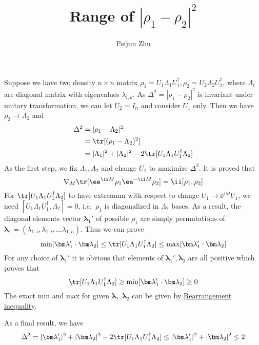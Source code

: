 \documentclass{article}
\begin{document}
\author{Peijun Zhu}
\title{Range of $|\rho_1-\rho_2|^2$}
\maketitle


Suppose we have two density $n\times n$ matrix 
$\rho_1=U_1\Lambda_1U_1^\dagger, \rho_2=U_2\Lambda_2U_2^\dagger$, where $\Lambda_i$ are diagonal matrix with eigenvalues $\lambda_{i, k}$. As $\Delta^2=|\rho_1-\rho_2|^2$ is invariant under unitary transformation, we can let $U_2=I_n$ and consider $U_1$ only. Then we have $\rho_2\rightarrow \Lambda_2$ and
\begin{align}
	\Delta^2&=|\rho_1-\Lambda_2|^2\\
	&=\tr[(\rho_1-\Lambda_2)^2]\\
	&=|\Lambda_1|^2+|\Lambda_2|^2-2\tr[U_1\Lambda_1U_1^\dagger\Lambda_2]\label{final}
\end{align}
As the first step, we fix $\Lambda_1, \Lambda_2$ and change $U_1$ to maximize $\Delta^2$. It is proved that
\begin{equation}
\nabla_M \tr[\ee^{\ii M}\rho_1\ee^{-\ii M}\rho_2]=\ii[\rho_1, \rho_2]
\end{equation}
For $\tr[U_1\Lambda_1U_1^\dagger\Lambda_2]$ to have extremum with respect to change $U_1\rightarrow \ee^{\ii M}U_1$, we need $[U_1\Lambda_1U_1^\dagger, \Lambda_2]=0$, i.e.\ $\rho_1$ is diagonalized in $\Lambda_2$ bases. As a result, the diagonal elements vector $\bm{\lambda_1}'$ of possible $\rho_1$ are simply permutations of $\bm \lambda_1=(\lambda_{1,i},\lambda_{1,i},\ldots\lambda_{1, n})$. Thus we can prove
\begin{equation}
\min [\bm\lambda_1'\cdot\bm\lambda_2]\leq\tr[U_1\Lambda_1U_1^\dagger\Lambda_2]\leq \max [\bm\lambda_1'\cdot\bm\lambda_2]
\end{equation}
For any choice of $\bm\lambda_1'$ it is obvious that elements of $\bm\lambda_1', \bm\lambda_2$ are all positive which proves that
\[\tr[U_1\Lambda_1U_1^\dagger\Lambda_2]\geq\min[\bm\lambda_1'\cdot\bm\lambda_2]\geq0\]
The exact min and max for given $\bm\lambda_1, \bm\lambda_2$ can be given by \href{https://en.wikipedia.org/wiki/Rearrangement_inequality}{Rearrangement inequality}. 

As a final result, we have
\begin{equation}
	\Delta^2 = |\bm \lambda_1'|^2+|\bm \lambda_2|^2-2\tr[U_1\Lambda_1U_1^\dagger\Lambda_2]\leq|\bm \lambda_1'|^2+|\bm \lambda_2|^2\leq 2
\end{equation}
\end{document}
